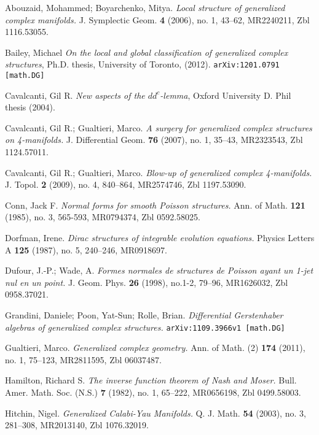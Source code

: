 \begin{thebibliography}{9}
Abouzaid, Mohammed; Boyarchenko, Mitya.  \emph{Local structure of generalized complex manifolds.} J. Symplectic Geom.  \textbf{4} (2006), no. 1, 43--62, MR2240211, Zbl 1116.53055.

Bailey, Michael \emph{On the local and global classification of generalized complex structures}, Ph.D. thesis, University of Toronto, (2012).  {\tt arXiv:1201.0791 [math.DG]}

Cavalcanti, Gil R. \emph{New aspects of the $dd^c$-lemma}, Oxford University D. Phil thesis (2004).

Cavalcanti, Gil R.; Gualtieri, Marco. \emph{A surgery for generalized complex structures on 4-manifolds.} J. Differential Geom. \textbf{76} (2007), no. 1, 35--43, MR2323543, Zbl 1124.57011.

Cavalcanti, Gil R.; Gualtieri, Marco. \emph{Blow-up of generalized complex 4-manifolds.} J. Topol. \textbf{2} (2009), no. 4, 840--864, MR2574746, Zbl 1197.53090.

Conn, Jack F. \emph{Normal forms for smooth Poisson structures.} Ann. of Math. \textbf{121} (1985), no. 3, 565-593, MR0794374, Zbl 0592.58025.

Dorfman, Irene. \emph{Dirac structures of integrable evolution equations.} Physics Letters A \textbf{125} (1987), no. 5, 240--246, MR0918697.

Dufour, J.-P.; Wade, A. \emph{Formes normales de structures de Poisson ayant un 1-jet nul en un point.} J. Geom. Phys. \textbf{26} (1998), no.1-2, 79--96, MR1626032, Zbl 0958.37021.

Grandini, Daniele; Poon, Yat-Sun; Rolle, Brian. \emph{Differential Gerstenhaber algebras of generalized complex structures.}  {\tt arXiv:1109.3966v1 [math.DG]}

Gualtieri, Marco. \emph{Generalized complex geometry.} Ann. of Math. (2) \textbf{174} (2011), no. 1, 75--123, MR2811595, Zbl 06037487.

Hamilton, Richard S. \emph{The inverse function theorem of Nash and Moser.} Bull. Amer. Math. Soc. (N.S.) \textbf{7} (1982), no. 1, 65--222, MR0656198, Zbl 0499.58003.

Hitchin, Nigel. \emph{Generalized Calabi-Yau Manifolds.} Q. J. Math. \textbf{54} (2003), no. 3, 281--308, MR2013140, Zbl 1076.32019.


\end{thebibliography}
